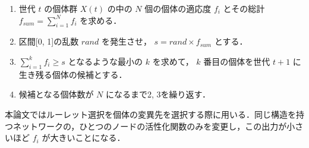 \begin{enumerate}
    \item 世代 $ t $ の個体群 $ X(t) $ の中の $ N $ 個の個体の適応度 $ f_i $ とその総計 $ f_{sum} = \sum^N_{i=1} f_i $ を求める．

    \item 区間[0, 1]の乱数 $ rand $ を発生させ， $ s = rand \times f_{sum} $ とする．

    \item $ \sum^k_{i=1} f_i \geq s $ となるような最小の $ k $ を求めて， $ k $ 番目の個体を世代 $ t+1 $ に生き残る個体の候補とする．

    \item 候補となる個体数が $ N $ になるまで2, 3を繰り返す．
\end{enumerate}

本論文ではルーレット選択を個体の変異先を選択する際に用いる．同じ構造を持つネットワークの，ひとつのノードの活性化関数のみを変更し，この出力が小さいほど $ f_i $ が大きいことになる．
